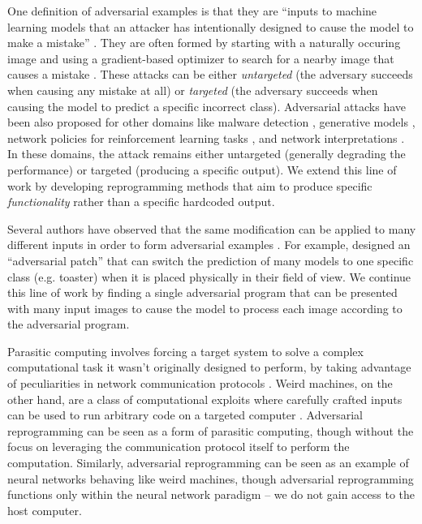 \documentclass{article}
\begin{document}
One definition of adversarial examples is that they are
``inputs to machine learning models that an attacker has intentionally designed to cause the model to make a mistake''
\citep{goodfellow2017}.
They are often formed by starting with a naturally occuring image
and using a gradient-based optimizer to search for a nearby
image that causes a mistake
\citep{Biggio13,szegedy2013intriguing,7958570}.
These attacks can be either {\em untargeted} (the adversary succeeds
when causing any mistake at all) or {\em targeted} (the adversary
succeeds when causing the model to predict a specific incorrect class).
Adversarial attacks have been also proposed for other domains like malware detection \citep{grosse17}, generative models \citep{kos2017adversarial}, network policies for reinforcement learning tasks \citep{huang2017adversarial}, and network interpretations \citep{ghorbani2017interpretation}. 
In these domains, the attack remains either untargeted (generally degrading the performance)
or targeted (producing a specific output).
We extend this line of work by developing reprogramming methods that aim to
produce specific {\em functionality} rather than a specific hardcoded output.

Several authors have observed that the same modification can be
applied to many different inputs in order to form adversarial
examples \citep{goodfellow2014explaining,moosavi2017universal}.
For example,  \citet{brown2017adversarial} designed an
``adversarial patch'' that can switch the prediction of many models
to one specific class (e.g. toaster) when it is placed physically
in their field of view.
We continue this line of work by finding a single adversarial
program that can be presented with many input images to cause
the model to process each image according to the adversarial
program.


Parasitic computing involves 
forcing a target system to solve a complex computational task it wasn't originally designed to perform, 
by taking advantage of peculiarities in network communication protocols \citep{barabasi2001parasitic,peresini2013network}. 
Weird machines, on the other hand, are a class of computational exploits where carefully crafted inputs can be used to run arbitrary code on a targeted computer \citep{bratus2011exploit}. 
Adversarial reprogramming can be seen as a form of parasitic computing, though without the focus on leveraging the communication protocol itself to perform the computation. 
Similarly, adversarial reprogramming can be seen as an example of neural networks behaving like weird machines, 
though adversarial reprogramming functions only within the neural network paradigm -- we do not gain 
access to the host computer.
\end{document}
